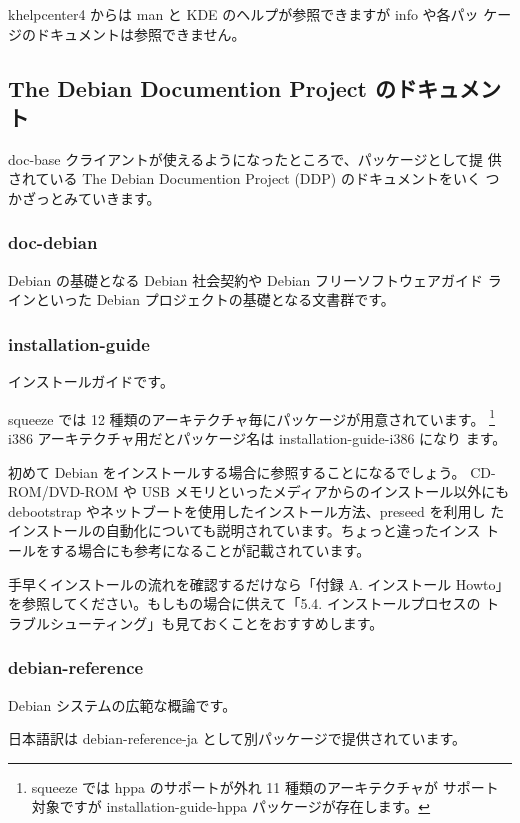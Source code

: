 \documentclass[mingoth,a4paper]{jsarticle}
\begin{document}
khelpcenter4 からは man と KDE のヘルプが参照できますが info や各パッ
ケージのドキュメントは参照できません。

\subsection{The Debian Documention Project のドキュメント}
doc-base クライアントが使えるようになったところで、パッケージとして提
供されている The Debian Documention Project (DDP) のドキュメントをいく
つかざっとみていきます。

\subsubsection{doc-debian}
Debian の基礎となる Debian 社会契約や Debian フリーソフトウェアガイド
ラインといった Debian プロジェクトの基礎となる文書群です。


\subsubsection{installation-guide}

インストールガイドです。

squeeze では 12 種類のアーキテクチャ毎にパッケージが用意されています。
\footnote{squeeze では hppa のサポートが外れ 11 種類のアーキテクチャが
サポート対象ですが installation-guide-hppa パッケージが存在します。}
i386 アーキテクチャ用だとパッケージ名は installation-guide-i386 になり
ます。

初めて Debian をインストールする場合に参照することになるでしょう。
CD-ROM/DVD-ROM や USB メモリといったメディアからのインストール以外にも
debootstrap やネットブートを使用したインストール方法、preseed を利用し
たインストールの自動化についても説明されています。ちょっと違ったインス
トールをする場合にも参考になることが記載されています。

手早くインストールの流れを確認するだけなら「付録 A. インストール Howto」
を参照してください。もしもの場合に供えて「5.4. インストールプロセスの
  トラブルシューティング」も見ておくことをおすすめします。


\subsubsection{debian-reference}

Debian システムの広範な概論です。

日本語訳は debian-reference-ja として別パッケージで提供されています。
\end{document}
